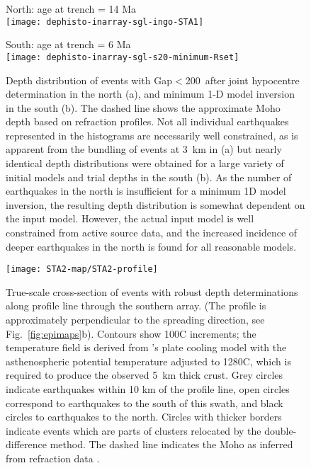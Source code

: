 \documentclass[reviewcopy]{elsart}
\renewcommand{\includegraphics}[2][]{\fbox{#2}}
\begin{document}
\begin{figure}

\begin{minipage}[t]{0.4\textwidth}
{ North: age at trench = 14 Ma} \\
\texttt{[image: dephisto-inarray-sgl-ingo-STA1]}
\end{minipage}\hfill%
\begin{minipage}[t]{0.4\textwidth}
{ South: age at trench = 6 Ma} \\
\texttt{[image: dephisto-inarray-sgl-s20-minimum-Rset]}
\end{minipage}


\caption{Depth distribution of events with
  Gap$<$200\dg\ after  joint
  hypocentre determination in the north (a), and minimum 1-D model
inversion in the south (b). The
  dashed line shows the approximate Moho depth based on refraction
profiles. 
Not all individual earthquakes represented in the
  histograms are necessarily well constrained, as is apparent from the
  bundling of events at 3~km in (a) but nearly identical depth distributions were
  obtained for a large variety of initial models and trial depths in
  the south
  (b).  As the number of earthquakes in the north is insufficient for
  a minimum 1D model inversion, the resulting depth distribution is
  somewhat dependent on the input model.  However, the actual input model
  is well constrained from active source data, and the increased
  incidence of deeper earthquakes in the north is found for all
  reasonable models. 
} 
\label{fig:dephistos}
\end{figure}


\begin{figure}
\centering
\texttt{[image: STA2-map/STA2-profile]}
\caption{True-scale cross-section of events with robust depth determinations along
  profile line through the southern array. (The profile is
  approximately perpendicular to the spreading direction, see Fig.~\ref{fig:epimaps}b). Contours show 100\dg C increments; the temperature field is derived
  from \citeauthor{mckenzie05}'s \citeyearpar{mckenzie05} plate cooling model with the
  asthenospheric potential temperature adjusted to 1280\dg C, which is
  required to produce the observed 5~km thick crust. Grey circles
  indicate earthquakes within 10 km of the profile line, open circles
  correspond to earthquakes to the south of this swath, and black circles to
  earthquakes to the north. Circles with thicker borders indicate
  events which are parts of clusters relocated by the
  double-difference method.
The dashed line indicates the Moho as inferred from refraction data \citep{scherwath06}.}
\label{fig:profiles}
\end{figure}
\end{document}
